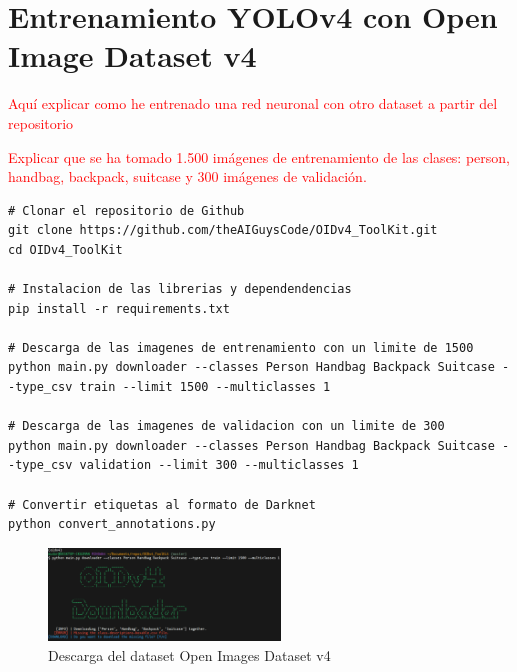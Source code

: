 \newpage

\section{Entrenamiento YOLOv4 con Open Image Dataset v4}
\label{sec:train-openimagesv4}

\textcolor{red}{Aquí explicar como he entrenado una red neuronal con otro dataset a partir del repositorio \cite{OIDv4_ToolKit}}

\textcolor{red}{Explicar que se ha tomado 1.500 imágenes de entrenamiento de las clases: person, handbag, backpack, suitcase y 300 imágenes de validación.}

\vspace{0.5cm}
\begin{lstlisting}[language=iPython,caption=Descarga dataset Open Images Dataset v4,captionpos=b,label={lst:download-oidv4}]
# Clonar el repositorio de Github
git clone https://github.com/theAIGuysCode/OIDv4_ToolKit.git
cd OIDv4_ToolKit

# Instalacion de las librerias y dependendencias
pip install -r requirements.txt

# Descarga de las imagenes de entrenamiento con un limite de 1500
python main.py downloader --classes Person Handbag Backpack Suitcase --type_csv train --limit 1500 --multiclasses 1

# Descarga de las imagenes de validacion con un limite de 300
python main.py downloader --classes Person Handbag Backpack Suitcase --type_csv validation --limit 300 --multiclasses 1

# Convertir etiquetas al formato de Darknet
python convert_annotations.py
\end{lstlisting}

\begin{figure}[ht]
\centering
\includegraphics[width=0.55\textwidth]{img/chapters/resultados/datasets/download-oidv4.png}
\caption{\label{fig:download-oidv4}Descarga del dataset Open Images Dataset v4}
\end{figure}

